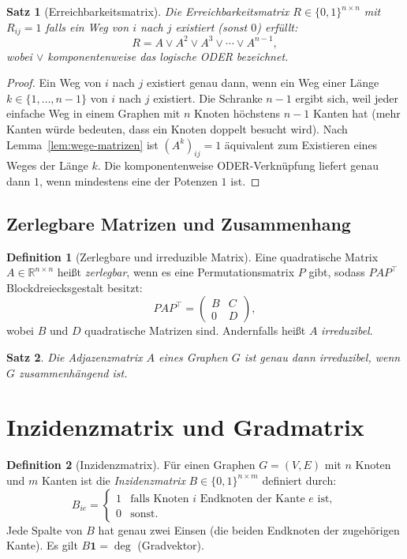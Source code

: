 ﻿\documentclass[a4paper,12pt,openany,oneside]{book}
\theoremstyle{definition}
\newtheorem{definition}{Definition}[chapter]
\theoremstyle{plain}
\newtheorem{satz}{Satz}[chapter]
\theoremstyle{remark}
\begin{document}
\begin{satz}[Erreichbarkeitsmatrix]
  \label{satz:erreichbarkeit}
  Die \emph{Erreichbarkeitsmatrix} $R \in \{0,1\}^{n \times n}$ mit
  $R_{ij} = 1$ falls ein Weg von $i$ nach $j$ existiert (sonst $0$)
  erf\"ullt:
  \[
    R = A \vee A^2 \vee A^3 \vee \cdots \vee A^{n-1},
  \]
  wobei $\vee$ komponentenweise das logische ODER bezeichnet.
\end{satz}

\begin{proof}
  Ein Weg von $i$ nach $j$ existiert genau dann, wenn ein Weg einer
  L\"ange $k \in \{1, \ldots, n-1\}$ von $i$ nach $j$ existiert. Die
  Schranke $n-1$ ergibt sich, weil jeder einfache Weg in einem Graphen
  mit $n$ Knoten h\"ochstens $n-1$ Kanten hat (mehr Kanten w\"urde
  bedeuten, dass ein Knoten doppelt besucht wird). Nach
  Lemma~\ref{lem:wege-matrizen} ist $(A^k)_{ij} = 1$ \"aquivalent zum
  Existieren eines Weges der L\"ange $k$. Die komponentenweise ODER-Verkn\"upfung
  liefert genau dann $1$, wenn mindestens eine der Potenzen $1$ ist.
\end{proof}

\subsection{Zerlegbare Matrizen und Zusammenhang}

\begin{definition}[Zerlegbare und irreduzible Matrix]
  Eine quadratische Matrix $A \in \mathbb{R}^{n \times n}$ hei\ss{}t
  \emph{zerlegbar}, wenn es eine Permutationsmatrix $P$ gibt, sodass
  $P A P^\top$ Blockdreiecksgestalt besitzt:
  \[
    P A P^\top = \begin{pmatrix} B & C \\ 0 & D \end{pmatrix},
  \]
  wobei $B$ und $D$ quadratische Matrizen sind. Andernfalls hei\ss{}t $A$
  \emph{irreduzibel}.
\end{definition}

\begin{satz}
  Die Adjazenzmatrix $A$ eines Graphen $G$ ist genau dann irreduzibel,
  wenn $G$ zusammenh\"angend ist.
\end{satz}

\section{Inzidenzmatrix und Gradmatrix}

\begin{definition}[Inzidenzmatrix]
  F\"ur einen Graphen $G = (V,E)$ mit $n$ Knoten und $m$ Kanten ist die
  \emph{Inzidenzmatrix} $B \in \{0,1\}^{n \times m}$ definiert durch:
  \[
    B_{ie} = \begin{cases}
               1 & \text{falls Knoten } i \text{ Endknoten der Kante } e \text{ ist},\\
               0 & \text{sonst.}
             \end{cases}
  \]
  Jede Spalte von $B$ hat genau zwei Einsen (die beiden Endknoten der
  zugeh\"origen Kante). Es gilt $B \mathbf{1} = \deg$ (Gradvektor).
\end{definition}
\end{document}
